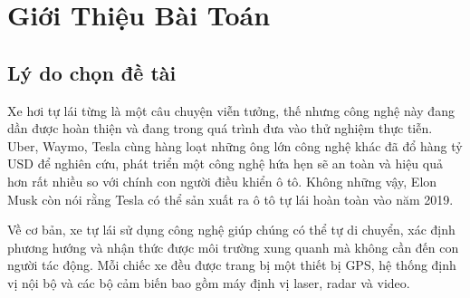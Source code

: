 \chapter{Giới Thiệu Bài Toán}
\section{Lý do chọn đề tài}
Xe hơi tự lái từng là một câu chuyện viễn tưởng, thế nhưng công nghệ này đang dần được hoàn thiện và đang trong quá trình đưa vào thử nghiệm thực tiễn. Uber, Waymo, Tesla cùng hàng loạt những ông lớn công nghệ khác đã đổ hàng tỷ USD để nghiên cứu, phát triển một công nghệ hứa hẹn sẽ an toàn và hiệu quả hơn rất nhiều so với chính con người điều khiển ô tô. Không những vậy, Elon Musk \protect \footnotemark {} còn nói rằng Tesla có thể sản xuất ra ô tô tự lái hoàn toàn vào năm 2019.\par
Về cơ bản, xe tự lái sử dụng công nghệ giúp chúng có thể tự di chuyển, xác định phương hướng và nhận thức được môi trường xung quanh mà không cần đến con người tác động. Mỗi chiếc xe đều được trang bị một thiết bị GPS, hệ thống định vị nội bộ và các bộ cảm biến bao gồm máy định vị laser, radar và video.\par 

